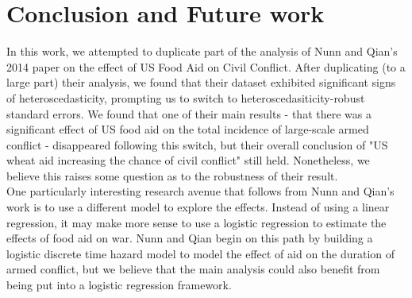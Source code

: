 \documentclass{article}
\begin{document}
\section{Conclusion and Future work}
In this work, we attempted to duplicate part of the analysis of Nunn and Qian's 2014 paper on the effect of US Food Aid on Civil Conflict. After duplicating (to a large part) their analysis, we found that their dataset exhibited significant signs of heteroscedasticity, prompting us to switch to heteroscedasiticity-robust standard errors. We found that one of their main results - that there was a significant effect of US food aid on the total incidence of large-scale armed conflict - disappeared following this switch, but their overall conclusion of "US wheat aid increasing the chance of civil conflict" still held. Nonetheless, we believe this raises some question as to the robustness of their result. \\

One particularly interesting research avenue that follows from Nunn and Qian's work is to use a different model to explore the effects. Instead of using a linear regression, it may make more sense to use a logistic regression to estimate the effects of food aid on war. Nunn and Qian begin on this path by building a logistic discrete time hazard model to model the effect of aid on the duration of armed conflict, but we believe that the main analysis could also benefit from being put into a logistic regression framework. 
\end{document}
